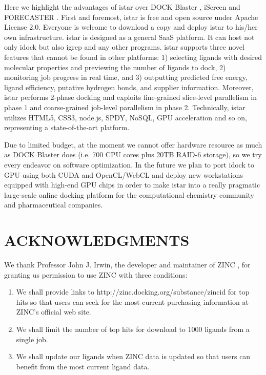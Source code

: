 \documentclass[12pt]{article}
\begin{document}
Here we highlight the advantages of istar over DOCK Blaster \citep{557}, iScreen \citep{899} and FORECASTER \citep{1012}. First and foremost, istar is free and open source under Apache License 2.0. Everyone is welcome to download a copy and deploy istar to his/her own infrastructure. istar is designed as a general SaaS platform. It can host not only idock but also igrep and any other programs. istar supports three novel features that cannot be found in other platforms: 1) selecting ligands with desired molecular properties and previewing the number of ligands to dock, 2) monitoring job progress in real time, and 3) outputting predicted free energy, ligand efficiency, putative hydrogen bonds, and supplier information. Moreover, istar performs 2-phase docking and exploits fine-grained slice-level parallelism in phase 1 and coarse-grained job-level parallelism in phase 2. Technically, istar utilizes HTML5, CSS3, node.js, SPDY, NoSQL, GPU acceleration and so on, representing a state-of-the-art platform.

Due to limited budget, at the moment we cannot offer hardware resource as much as DOCK Blaster does (i.e. 700 CPU cores plus 20TB RAID-6 storage), so we try every endeavor on software optimization. In the future we plan to port idock to GPU using both CUDA and OpenCL/WebCL and deploy new workstations equipped with high-end GPU chips in order to make istar into a really pragmatic large-scale online docking platform for the computational chemistry community and pharmaceutical companies.

\section*{\sffamily \large ACKNOWLEDGMENTS}

We thank Professor John J. Irwin, the developer and maintainer of ZINC \citep{532,1178}, for granting us permission to use ZINC with three conditions:
\begin{enumerate}
\item We shall provide links to http://zinc.docking.org/substance/zincid for top hits so that users can seek for the most current purchasing information at ZINC's official web site.
\item We shall limit the number of top hits for download to 1000 ligands from a single job.
\item We shall update our ligands when ZINC data is updated so that users can benefit from the most current ligand data.
\end{enumerate}
\end{document}
